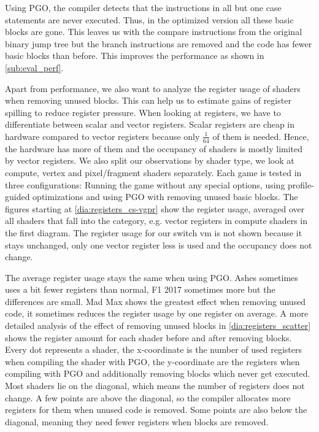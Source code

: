 Using PGO, the compiler detects that the instructions in all but one case statements are never executed.
Thus, in the optimized version all these basic blocks are gone.
This leaves us with the compare instructions from the original binary jump tree but the branch instructions are removed and the code has fewer basic blocks than before.
This improves the performance as shown in \cref{sub:eval_perf}.

Apart from performance, we also want to analyze the register usage of shaders when removing unused blocks.
This can help us to estimate gains of register spilling to reduce register pressure.
When looking at registers, we have to differentiate between scalar and vector registers.
Scalar registers are cheap in hardware compared to vector registers because only $\frac{1}{64}$ of them is needed.
Hence, the hardware has more of them and the occupancy of shaders is mostly limited by vector registers.
We also split our observations by shader type, we look at compute, vertex and pixel/fragment shaders separately.
Each game is tested in three configurations: Running the game without any special options, using profile-guided optimizations and using PGO with removing unused basic blocks.
The figures starting at \cref{dia:registers_cs-vgpr} show the register usage, averaged over all shaders that fall into the category, e.g. vector registers in compute shaders in the first diagram.
The register usage for our switch vm is not shown because it stays unchanged, only one vector register less is used and the occupancy does not change.


The average register usage stays the same when using PGO. Ashes sometimes uses a bit fewer registers than normal, F1 2017 sometimes more but the differences are small.
Mad Max shows the greatest effect when removing unused code, it sometimes reduces the register usage by one register on average.
A more detailed analysis of the effect of removing unused blocks in \cref{dia:registers_scatter} shows the register amount for each shader before and after removing blocks.
Every dot represents a shader, the x-coordinate is the number of used registers when compiling the shader with PGO, the y-coordinate are the registers when compiling with PGO and additionally removing blocks which never get executed.
Most shaders lie on the diagonal, which means the number of registers does not change.
A few points are above the diagonal, so the compiler allocates more registers for them when unused code is removed.
Some points are also below the diagonal, meaning they need fewer registers when blocks are removed.


